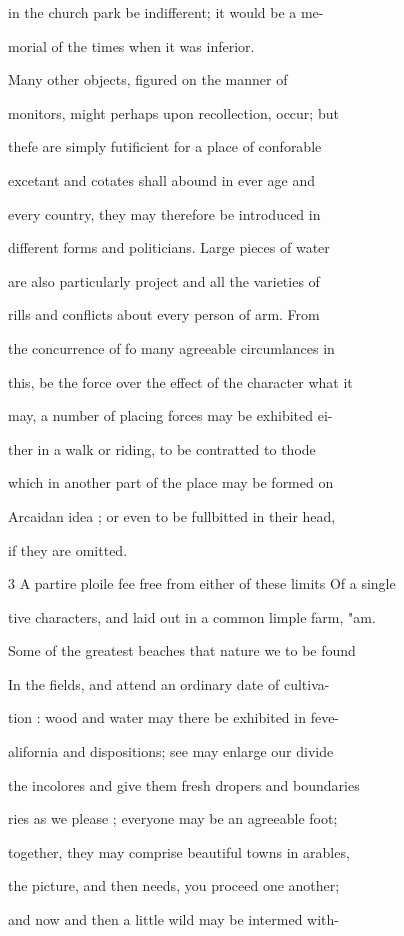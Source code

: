 \documentclass{article}
\begin{document}
in the church park be indifferent; it would be a me-

morial of the times when it was inferior.

Many other objects, figured on the manner of

monitors, might perhaps upon recollection, occur; but

thefe are simply futificient for a place of conforable

excetant and cotates shall abound in ever age and

every country, they may therefore be introduced in

different forms and politicians. Large pieces of water

are also particularly project and all the varieties of

rills and conflicts about every person of arm. From

the concurrence of fo many agreeable circumlances in

this, be the force over the effect of the character what it

may, a number of placing forces may be exhibited ei-

ther in a walk or riding, to be contratted to thode

which in another part of the place may be formed on

Arcaidan idea ; or even to be fullbitted in their head,

if they are omitted.

3 A partire ploile fee free from either of these limits Of a single

tive characters, and laid out in a common limple farm, "am.

Some of the greatest beaches that nature we to be found

In the fields, and attend an ordinary date of cultiva-

tion : wood and water may there be exhibited in feve-

alifornia and dispositions; see may enlarge our divide

the incolores and give them fresh dropers and boundaries

ries as we please ; everyone may be an agreeable foot;

together, they may comprise beautiful towns in arables,

the picture, and then needs, you proceed one another;

and now and then a little wild may be intermed with-
\end{document}
